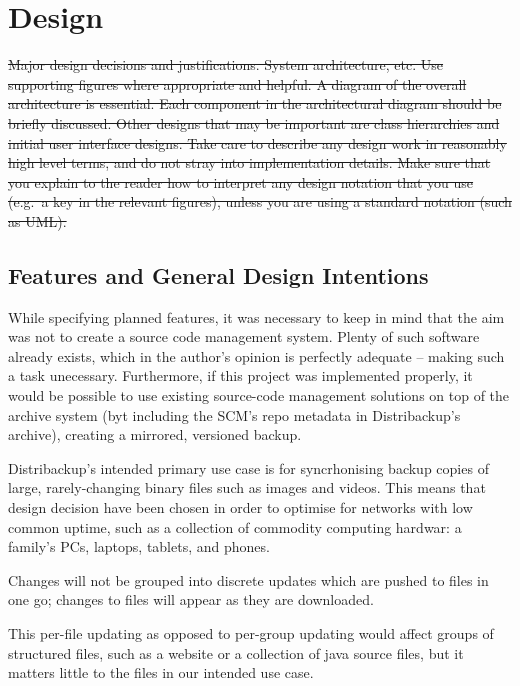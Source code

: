 \documentclass[12pt,a4paper,]{book}
\begin{document}
\section{Design}\label{design}

\sout{Major design decisions and justifications. System architecture,
etc. Use supporting figures where appropriate and helpful. A diagram of
the overall architecture is essential. Each component in the
architectural diagram should be briefly discussed. Other designs that
may be important are class hierarchies and initial user interface
designs. Take care to describe any design work in reasonably high level
terms, and do not stray into implementation details. Make sure that you
explain to the reader how to interpret any design notation that you use
(e.g.~a key in the relevant figures), unless you are using a standard
notation (such as UML).}

\subsection{Features and General Design
Intentions}\label{features-and-general-design-intentions}

While specifying planned features, it was necessary to keep in mind that
the aim was not to create a source code management system. Plenty of
such software already exists, which in the author's opinion is perfectly
adequate -- making such a task unecessary. Furthermore, if this project
was implemented properly, it would be possible to use existing
source-code management solutions on top of the archive system (byt
including the SCM's repo metadata in Distribackup's archive), creating a
mirrored, versioned backup.

Distribackup's intended primary use case is for syncrhonising backup
copies of large, rarely-changing binary files such as images and videos.
This means that design decision have been chosen in order to optimise
for networks with low common uptime, such as a collection of commodity
computing hardwar: a family's PCs, laptops, tablets, and phones.

Changes will not be grouped into discrete updates which are pushed to
files in one go; changes to files will appear as they are downloaded.

This per-file updating as opposed to per-group updating would affect
groups of structured files, such as a website or a collection of java
source files, but it matters little to the files in our intended use
case.
\end{document}
